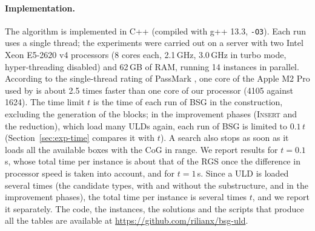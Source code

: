 \paragraph{Implementation.}
The algorithm is implemented in C++ (compiled with g++ 13.3, \texttt{-O3}). Each run uses a
single thread; the experiments were carried out on a server with two Intel Xeon E5-2620 v4
processors (8 cores each, 2.1\,GHz, 3.0\,GHz in turbo mode, hyper-threading disabled) and
62\,GB of RAM, running 14 instances in parallel.
According to the single-thread rating of PassMark \citep{PassMark}, one core of the Apple M2 Pro
used by \citet{Hessler2025} is about 2.5 times faster than one core of our processor (4105
against 1624).
The time limit $t$ is the time of each run of BSG in the construction, excluding the generation
of the blocks; in the improvement phases (\textsc{Insert} and the reduction), which load many ULDs
again, each run of BSG is limited to $0.1\,t$ (Section~\ref{sec:exp-time} compares it with
$t$). A search also stops as soon as it loads all the available boxes with the CoG in range. We
report results for $t = 0.1$\,s, whose total time per instance is about that of the RGS once the
difference in processor speed is taken into account, and for $t = 1$\,s. Since a ULD is loaded
several times (the candidate types, with and without the substructure, and in the improvement
phases), the total time per instance is several times $t$, and we report it separately. The code, the instances, the solutions and the scripts that
produce all the tables are available at \url{https://github.com/rilianx/bsg-uld}.

